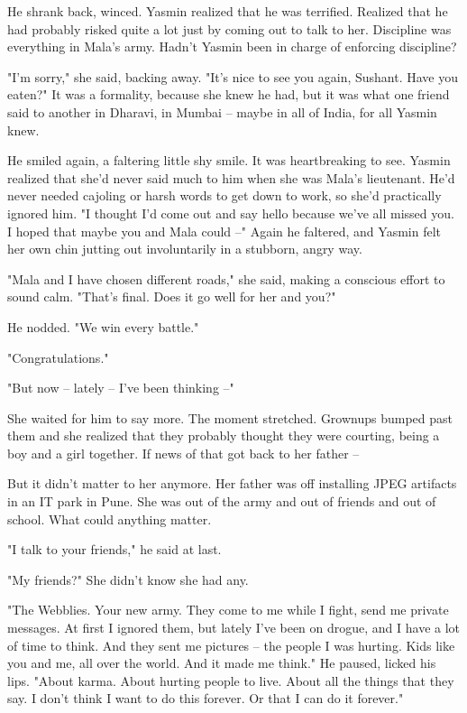 He shrank back, winced. Yasmin realized that he was terrified.
Realized that he had probably risked quite a lot just by coming out
to talk to her. Discipline was everything in Mala's army. Hadn't
Yasmin been in charge of enforcing discipline?

"I'm sorry," she said, backing away. "It's nice to see you again,
Sushant. Have you eaten?" It was a formality, because she knew he
had, but it was what one friend said to another in Dharavi, in
Mumbai -- maybe in all of India, for all Yasmin knew.

He smiled again, a faltering little shy smile. It was heartbreaking
to see. Yasmin realized that she'd never said much to him when she
was Mala's lieutenant. He'd never needed cajoling or harsh words to
get down to work, so she'd practically ignored him. "I thought I'd
come out and say hello because we've all missed you. I hoped that
maybe you and Mala could --" Again he faltered, and Yasmin felt her
own chin jutting out involuntarily in a stubborn, angry way.

"Mala and I have chosen different roads," she said, making a
conscious effort to sound calm. "That's final. Does it go well for
her and you?"

He nodded. "We win every battle."

"Congratulations."

"But now -- lately -- I've been thinking --"

She waited for him to say more. The moment stretched. Grownups
bumped past them and she realized that they probably thought they
were courting, being a boy and a girl together. If news of that got
back to her father --

But it didn't matter to her anymore. Her father was off installing
JPEG artifacts in an IT park in Pune. She was out of the army and
out of friends and out of school. What could anything matter.

"I talk to your friends," he said at last.

"My friends?" She didn't know she had any.

"The Webblies. Your new army. They come to me while I fight, send
me private messages. At first I ignored them, but lately I've been
on drogue, and I have a lot of time to think. And they sent me
pictures -- the people I was hurting. Kids like you and me, all
over the world. And it made me think." He paused, licked his lips.
"About karma. About hurting people to live. About all the things
that they say. I don't think I want to do this forever. Or that I
can do it forever."

